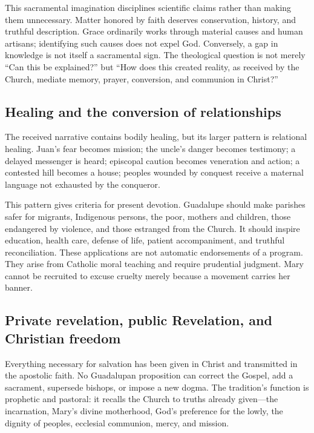 This sacramental imagination disciplines scientific claims rather than making them unnecessary. Matter honored by faith deserves conservation, history, and truthful description. Grace ordinarily works through material causes and human artisans; identifying such causes does not expel God. Conversely, a gap in knowledge is not itself a sacramental sign. The theological question is not merely “Can this be explained?” but “How does this created reality, as received by the Church, mediate memory, prayer, conversion, and communion in Christ?”

\subsection{Healing and the conversion of relationships}

The received narrative contains bodily healing, but its larger pattern is relational healing. Juan's fear becomes mission; the uncle's danger becomes testimony; a delayed messenger is heard; episcopal caution becomes veneration and action; a contested hill becomes a house; peoples wounded by conquest receive a maternal language not exhausted by the conqueror.

This pattern gives criteria for present devotion. Guadalupe should make parishes safer for migrants, Indigenous persons, the poor, mothers and children, those endangered by violence, and those estranged from the Church. It should inspire education, health care, defense of life, patient accompaniment, and truthful reconciliation. These applications are not automatic endorsements of a program. They arise from Catholic moral teaching and require prudential judgment. Mary cannot be recruited to excuse cruelty merely because a movement carries her banner.

\subsection{Private revelation, public Revelation, and Christian freedom}

Everything necessary for salvation has been given in Christ and transmitted in the apostolic faith. No Guadalupan proposition can correct the Gospel, add a sacrament, supersede bishops, or impose a new dogma. The tradition's function is prophetic and pastoral: it recalls the Church to truths already given---the incarnation, Mary's divine motherhood, God's preference for the lowly, the dignity of peoples, ecclesial communion, mercy, and mission.

